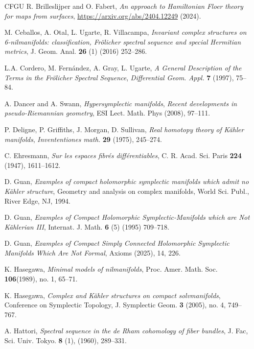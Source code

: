 \documentclass[a4paper]{amsart}
\theoremstyle{definition}
\theoremstyle{remark}
\numberwithin{equation}{section}
\begin{document}
\begin{thebibliography}{CFGU}
 R. Brilleslijper and O. Fabert, {\it An approach to Hamiltonian Floer theory for maps from surfaces}, \url{https://arxiv.org/abs/2404.12249} (2024).

 M. Ceballos, A. Otal, L. Ugarte, R. Villacampa, {\it Invariant complex structures on 6-nilmanifolds: classification, {F}r{\"o}licher spectral sequence and special {H}ermitian metrics}, J. Geom. Anal. {\bf 26} (1) (2016) 252--286.

 L.A. Cordero, M. Fern\'andez, A. Gray, L. Ugarte, {\it A General Description of the Terms in the Fr\"olicher Spectral Sequence}, \emph{Differential Geom. Appl.} {\bf 7} (1997), 75--84.

 A. Dancer and A. Swann, {\it Hypersymplectic manifolds}, \emph{Recent developments in pseudo-Riemannian geometry}, ESI Lect. Math. Phys (2008), 97--111.

 P. Deligne, P. Griffiths, J. Morgan, D. Sullivan, {\it Real homotopy theory of Kähler manifolds}, \emph{Invententiones math.} {\bf 29} (1975), 245--274.

 C. Ehresmann, {\it Sur les espaces fibr\'es diff\'erentiables}, C. R. Acad. Sci. Paris \textbf{224} (1947), 1611--1612.

 D. Guan, {\it Examples of compact holomorphic symplectic manifolds which admit no {K}\"ahler structure}, Geometry and analysis on complex manifolds, World Sci. Publ., River Edge, NJ, 1994.

 D. Guan, {\it Examples of Compact Holomorphic Symplectic-Manifolds which are Not {K}\"ahlerian {III}}, Internat. J. Math. {\bf 6} (5) (1995) 709--718.

 D. Guan, {\it Examples of Compact Simply Connected Holomorphic Symplectic Manifolds Which Are Not Formal}, Axioms (2025), 14, 226.

 K. Hasegawa, {\it Minimal models of nilmanifolds}, Proc. Amer. Math. Soc. {\bf 106}(1989), no. 1, 65--71.

 K. Hasegawa, {\it Complex and K\"ahler structures on compact solvmanifolds}, Conference on Symplectic Topology, J.
Symplectic Geom. {\bf 3} (2005), no. 4, 749--767.

 A. Hattori, {\it Spectral sequence in the de Rham cohomology of fiber bundles}, J. Fac, Sci. Univ. Tokyo. {\bf 8} (1), (1960), 289--331.


\end{thebibliography}
\end{document}
